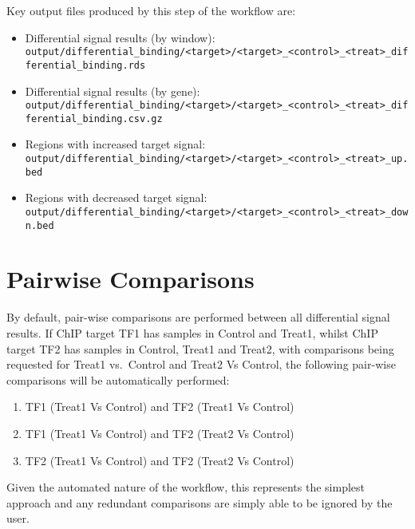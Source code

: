 \documentclass[
]{book}
\providecommand{\tightlist}{%
  \setlength{\itemsep}{0pt}\setlength{\parskip}{0pt}}
\begin{document}
Key output files produced by this step of the workflow are:

\begin{itemize}
\tightlist
\item
  Differential signal results (by window): \texttt{output/differential\_binding/\textless{}target\textgreater{}/\textless{}target\textgreater{}\_\textless{}control\textgreater{}\_\textless{}treat\textgreater{}\_differential\_binding.rds}
\item
  Differential signal results (by gene): \texttt{output/differential\_binding/\textless{}target\textgreater{}/\textless{}target\textgreater{}\_\textless{}control\textgreater{}\_\textless{}treat\textgreater{}\_differential\_binding.csv.gz}
\item
  Regions with increased target signal: \texttt{output/differential\_binding/\textless{}target\textgreater{}/\textless{}target\textgreater{}\_\textless{}control\textgreater{}\_\textless{}treat\textgreater{}\_up.bed}
\item
  Regions with decreased target signal: \texttt{output/differential\_binding/\textless{}target\textgreater{}/\textless{}target\textgreater{}\_\textless{}control\textgreater{}\_\textless{}treat\textgreater{}\_down.bed}
\end{itemize}

\hypertarget{pairwise-comparisons}{%
\section{Pairwise Comparisons}\label{pairwise-comparisons}}

By default, pair-wise comparisons are performed between all differential signal results.
If ChIP target TF1 has samples in Control and Treat1, whilst ChIP target TF2 has samples in Control, Treat1 and Treat2, with comparisons being requested for Treat1 vs.~Control and Treat2 Vs Control, the following pair-wise comparisons will be automatically performed:

\begin{enumerate}
\def\labelenumi{\arabic{enumi}.}
\tightlist
\item
  TF1 (Treat1 Vs Control) and TF2 (Treat1 Vs Control)
\item
  TF1 (Treat1 Vs Control) and TF2 (Treat2 Vs Control)
\item
  TF2 (Treat1 Vs Control) and TF2 (Treat2 Vs Control)
\end{enumerate}

Given the automated nature of the workflow, this represents the simplest approach and any redundant comparisons are simply able to be ignored by the user.
\end{document}
